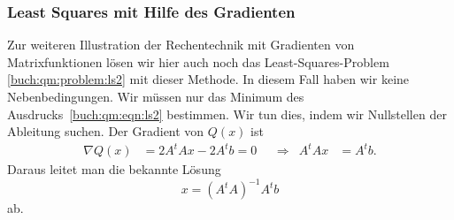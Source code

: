%
%
\subsubsection{Least Squares mit Hilfe des Gradienten}
Zur weiteren Illustration der Rechentechnik mit Gradienten von
Matrixfunktionen lösen wir hier auch noch das Least-Squares-Problem
\ref{buch:qm:problem:ls2} mit dieser Methode.
In diesem Fall haben wir keine Nebenbedingungen.
Wir müssen nur das Minimum des Ausdrucks~\eqref{buch:qm:eqn:ls2}
bestimmen.
Wir tun dies, indem wir Nullstellen der Ableitung suchen.
Der Gradient von $Q(x)$ ist
\begin{align*}
\nabla
Q(x)
&=
2A^tA x -2 A^tb = 0
&&\Rightarrow&A^tAx&=A^tb.
\end{align*}
Daraus leitet man die bekannte Lösung
\[
x = (A^tA)^{-1}A^tb
\]
ab.


